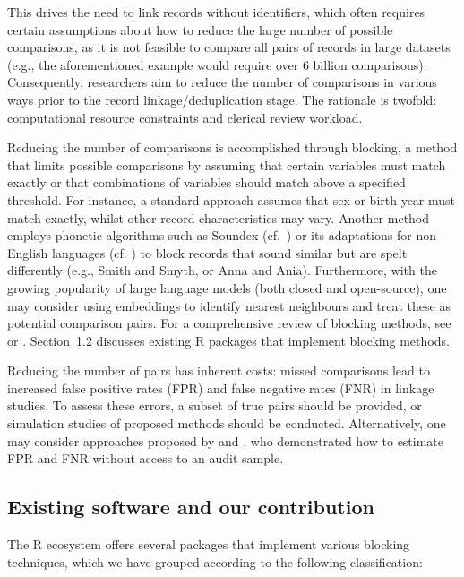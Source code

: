 This drives the need to link records without identifiers, which often
requires certain assumptions about how to reduce the large number of
possible comparisons, as it is not feasible to compare all pairs of
records in large datasets (e.g., the aforementioned example would
require over 6 billion comparisons). Consequently, researchers aim to
reduce the number of comparisons in various ways prior to the record
linkage/deduplication stage. The rationale is twofold: computational
resource constraints and clerical review workload.

Reducing the number of comparisons is accomplished through blocking, a
method that limits possible comparisons by assuming that certain
variables must match exactly or that combinations of variables should
match above a specified threshold. For instance, a standard approach
assumes that sex or birth year must match exactly, whilst other record
characteristics may vary. Another method employs phonetic algorithms
such as Soundex (cf.~\citet{Wright1960}) or its adaptations for non-English
languages (cf. \citet{Howard2020}) to block records that sound similar but
are spelt differently (e.g., Smith and Smyth, or Anna and Ania).
Furthermore, with the growing popularity of large language models (both
closed and open-source), one may consider using embeddings
\citep{mikolov2013efficient} to identify nearest neighbours and treat these
as potential comparison pairs. For a comprehensive review of blocking
methods, see \citet{Steorts2014} or \citet{Papadakis2020}. Section~1.2 discusses
existing R packages that implement blocking methods.

Reducing the number of pairs has inherent costs: missed comparisons lead
to increased false positive rates (FPR) and false negative rates (FNR)
in linkage studies. To assess these errors, a subset of true pairs
should be provided, or simulation studies of proposed methods should be
conducted. Alternatively, one may consider approaches proposed by
\citet{dasylva2021estimating} and \citet{dasylva2022consistent}, who demonstrated how
to estimate FPR and FNR without access to an audit sample.

\subsection{Existing software and our contribution}\label{sec-software}

The R ecosystem offers several packages that implement various blocking
techniques, which we have grouped according to the following
classification:

